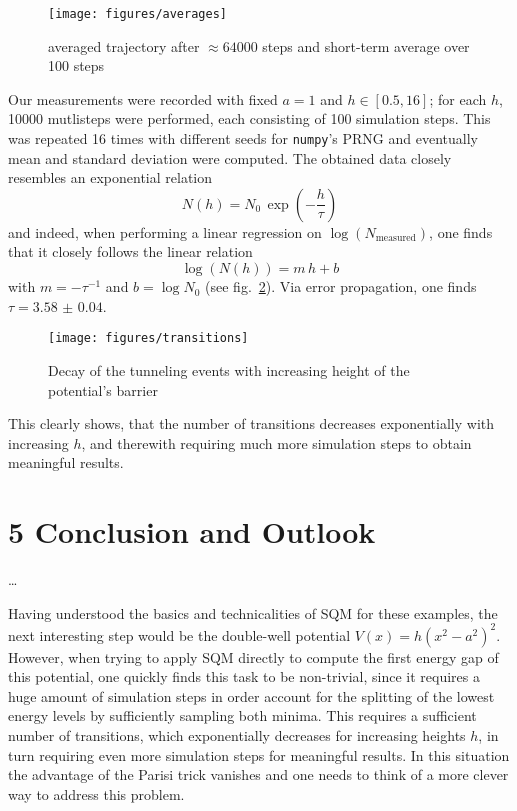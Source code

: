 \documentclass[11pt,a4paper]{scrartcl}
\newcommand*{\figref}[1]{(see fig.~\ref{#1})}
\begin{document}
\begin{figure}[h]
    \centering
    \texttt{[image: figures/averages]}
    \caption{averaged trajectory after $\approx\num{64000}$ steps and
    short-term average over \num{100} steps}
    \label{fig:avg}
\end{figure}

Our measurements were recorded with fixed $a=1$ and $h\in[0.5,16]$; for each
$h$, \num{10000} mutlisteps were performed, each consisting of 100 simulation
steps. This was repeated 16 times with different seeds for \texttt{numpy}'s
PRNG and eventually mean and standard deviation were computed. The obtained
data closely resembles an exponential relation
\begin{equation*}
    N(h)=N_0\,\exp\left(-\frac{h}{\tau}\right)
\end{equation*}
and indeed, when performing a linear regression on
$\log(N_{\mathrm{measured}})$, one finds that it closely follows the linear
relation
\begin{equation*}
    \log\left(N(h)\right)=m\,h+b
\end{equation*}
with $m=-\tau^{-1}$ and $b=\log{N_0}$ \figref{fig:transitions}. Via error
propagation, one finds
$\tau=\num{3.58(4)}$.

\begin{figure}[h]
    \centering
    \texttt{[image: figures/transitions]}
    \caption{Decay of the tunneling events with increasing height of the potential's barrier}
    \label{fig:transitions}
\end{figure}

This clearly shows, that the number of transitions decreases exponentially with
increasing $h$, and therewith requiring much more simulation steps to obtain
meaningful results.


\section*{5 Conclusion and Outlook}
\dots

Having understood the basics and technicalities of SQM for these
examples, the next interesting step would be the double-well potential
$V(x)=h\left(x^2-a^2\right)^2$.
However, when trying to apply SQM directly to compute the first energy gap of
this potential, one quickly finds this task to be non-trivial, since it
requires a huge amount of simulation steps in order account for the splitting
of the lowest energy levels by sufficiently sampling both minima. This requires
a sufficient number of transitions, which exponentially decreases for
increasing heights $h$, in turn requiring even more simulation steps for
meaningful results. In this situation the advantage of the Parisi trick
vanishes and one needs to think of a more clever way to address this problem.
\end{document}
